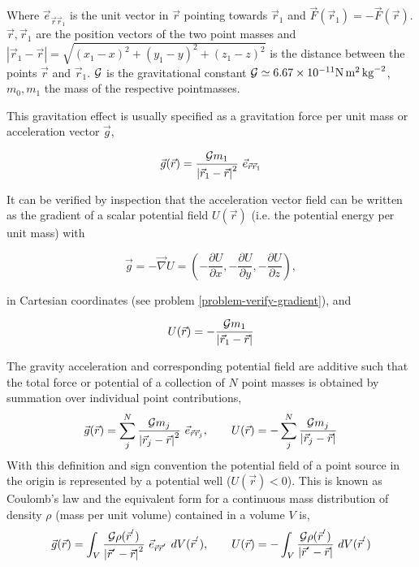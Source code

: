 Where ${\vec e}_{\vec{r}\vec{r}_1}$ is the unit vector in 
${\vec r}$ pointing towards ${\vec r}_1$
and ${\vec F}({\vec r}_1) = - {\vec F}({\vec r})$.
${\vec r}, {\vec r}_1$ 
are the position vectors of the two point masses
and 
$\left | {\vec r}_1 - {\vec r} \right | =
\sqrt{(x_1-x)^2 + (y_1-y)^2 + (z_1-z)^2}$
is the distance between the points ${\vec r}$ and ${\vec r}_1$.
${\cal G}$ is the gravitational constant 
${\cal G} \simeq 6.67 \times 10^{-11} \si{\newton\square\metre\per\square\kilo\gram}$,
$m_0, m_1$ the mass of the respective pointmasses.


This gravitation effect is usually specified as a gravitation force per 
unit mass or acceleration vector ${\vec g}$,
\begin{mdframed}[backgroundcolor=blue!5]
\begin{equation}
{\vec g}({\vec r}) =
\frac{{\cal G} m_1}{\left | {\vec r}_1 - {\vec r} \right | ^2} ~ {\vec e}_{\vec{r}\vec{r}_1} 
\label{grav_accel}
\end{equation}
\end{mdframed}
It can be verified by inspection that the acceleration vector field 
can be written as the 
gradient of a scalar potential field $U({\vec r})$ (i.e. the potential
energy per unit mass) with
\begin{mdframed}[backgroundcolor=blue!5]
\[
{\vec g} = - \vec\nabla U = 
(- \frac{\partial U}{\partial x}, 
 - \frac{\partial U}{\partial y}, 
 - \frac{\partial U}{\partial z}),\]
\end{mdframed}
in Cartesian coordinates (see problem \ref{problem-verify-gradient}),
and
\begin{mdframed}[backgroundcolor=blue!5]
\begin{equation}
U({\vec r}) = - \frac{{\cal G} m_1}{\left | {\vec r}_1 - {\vec r} \right |} 
\label{grav_potential}
\end{equation}
\end{mdframed}

The gravity acceleration and corresponding potential field are additive 
such that the total force or potential of a 
collection of $N$ point masses is obtained by summation over individual
point contributions,
\begin{equation}
{\vec g} ({\vec r}) = 
\sum_j^N \frac{{\cal G} m_j}{\left | {\vec r}_j - {\vec r} \right | ^2} ~ {\vec e}_{\vec{r}\vec{r}_j}
, 
\qquad
U({\vec r}) = 
- \sum_j^N \frac{{\cal G} m_j}{\left | {\vec r}_j - {\vec r} \right |}
\label{eq:gUexo}
\end{equation}
With this definition and sign convention the potential field of
a point source in the origin is represented by a
potential well ($U({\vec r}) < 0$).
This is known as Coulomb's law and the equivalent form for a continuous
mass distribution of density $\rho$ (mass per unit volume) contained in
a volume $V$ is,
\begin{equation}
{\vec g}({\vec r}) = 
\int_V \frac{{\cal G} \rho({\vec r}^{'})}
{\left | {\vec r}^{'} - {\vec r} \right | ^2} ~ 
{\vec e}_{\vec{r}\vec{r}^{'}} ~ dV({\vec r}^{'})
,
\qquad 
U({\vec r}) = 
- \int_V \frac{{\cal G} \rho({\vec r}^{'})}
                     {\left | {\vec r}^{'} - {\vec r} \right |} ~ 
dV({\vec r}^{'})
\label{Coulomb-integrals}
\end{equation}

